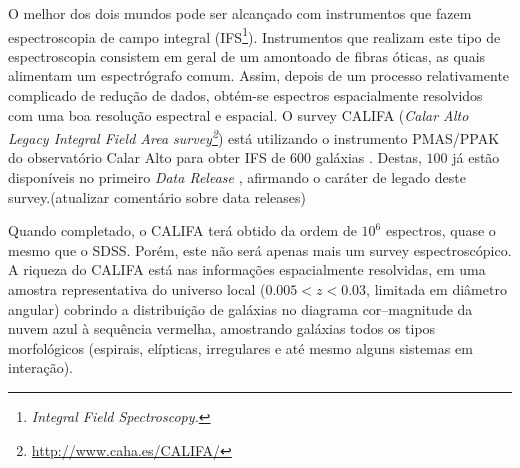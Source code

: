 O melhor dos dois mundos pode ser alcançado com instrumentos que fazem
espectroscopia de campo integral (IFS\footnote{\em Integral Field
Spectroscopy.}). Instrumentos que realizam este tipo de espectroscopia consistem
em geral de um amontoado de fibras óticas, as quais alimentam um espectrógrafo
comum. Assim, depois de um processo relativamente complicado de redução de
dados, obtém-se espectros espacialmente resolvidos com uma boa resolução
espectral e espacial. O survey CALIFA ({\em Calar Alto Legacy Integral Field
Area survey\footnote{\url{http://www.caha.es/CALIFA/}}}) está utilizando o
instrumento PMAS/PPAK do observatório Calar Alto para obter IFS de $600$
galáxias \citep{Sanchez2012}.
Destas, $100$ já estão disponíveis no primeiro {\em Data Release}
\citep[DR1]{Husemann2013}, afirmando o caráter de legado deste
survey.\fixme(atualizar comentário sobre data releases)

Quando completado, o CALIFA terá obtido da ordem de $10^6$ espectros, quase o
mesmo que o SDSS. Porém, este não será apenas mais um survey espectroscópico. A
riqueza do CALIFA está nas informações espacialmente resolvidas, em uma amostra
representativa do universo local ($0.005 < z < 0.03$, limitada em diâmetro
angular) cobrindo a distribuição de galáxias no diagrama cor--magnitude da nuvem
azul à sequência vermelha, amostrando galáxias todos os tipos morfológicos
(espirais, elípticas, irregulares e até mesmo alguns sistemas em interação).

